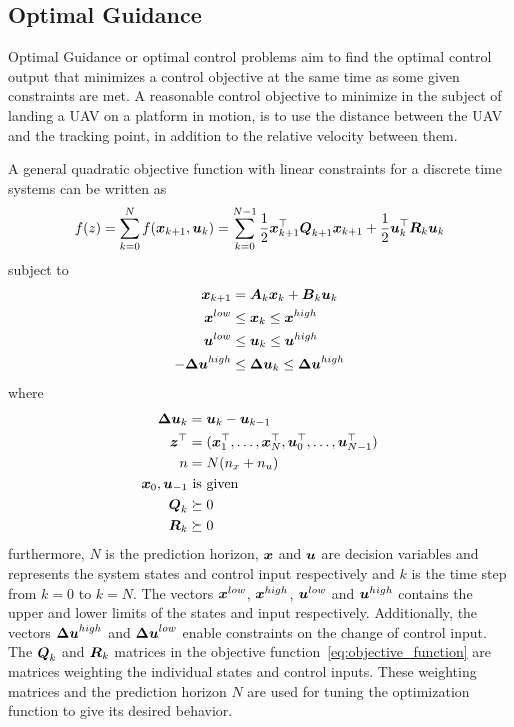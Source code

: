 \subsection{Optimal Guidance} %
\label{sub:optimal_guidance}
Optimal Guidance or optimal control problems aim to find the optimal control output that minimizes a control objective at the same time as some given constraints are met. A reasonable control objective to minimize in the subject of landing a \gls{UAV} on a platform in motion, is to use the distance between the \gls{UAV} and the tracking point, in addition to the relative velocity between them.  

A general quadratic objective function with linear constraints for a discrete time systems can be written as \citep{foss2013merging}
\begin{equation}\label{eq:objective_function}
	f(z)=\sum_{k=0}^{N}{f(\boldsymbol{x}_{k+1},\boldsymbol{u}_{k})}=\sum_{k=0}^{N-1}\frac{1}{2}\boldsymbol{x}_{k+1}^{\top}\boldsymbol{Q}_{k+1}\boldsymbol{x}_{k+1}+\frac{1}{2}\boldsymbol{u}_{k}^{\top}\boldsymbol{R}_{k}\boldsymbol{u}_{k}
\end{equation}
subject to
\begin{align}
	\boldsymbol{x}_{k+1}&=\boldsymbol{A}_k\boldsymbol{x}_k+\boldsymbol{B}_k\boldsymbol{u}_k\label{eq:objective_equality_const}\\
	\boldsymbol{x}^{low}&\le\boldsymbol{x}_k\le\boldsymbol{x}^{high}\\
	\boldsymbol{u}^{low}&\le\boldsymbol{u}_k\le\boldsymbol{u}^{high}\\
	-\boldsymbol{\Delta u}^{high}&\le\boldsymbol{\Delta u}_k\le\boldsymbol{\Delta u}^{high}
\end{align}
where
\begin{align}
	\label{eq:object_constraints_first}
	\boldsymbol{\Delta u}_k&=\boldsymbol{u}_k-\boldsymbol{u}_{k-1}\\
	\boldsymbol{z}^{\top}&=(\boldsymbol{x}_1^{\top},\dots,\boldsymbol{x}_N^{\top},\boldsymbol{u}_0^{\top},\dots,\boldsymbol{u}_{N-1}^{\top}) \\
	n&=N(n_x+n_u) \\
	\boldsymbol{x}_0, \boldsymbol{u}_{-1}&\text{ is given}\\
	\boldsymbol{Q}_k&\succeq0\\
	\label{eq:object_constraints_last}
	\boldsymbol{R}_k&\succeq0
\end{align}
furthermore, $N$ is the prediction horizon, $\boldsymbol{x}$ and $\boldsymbol{u}$ are decision variables and represents the system states and control input respectively and $k$ is the time step from $k=0$ to $k=N$. The vectors $\boldsymbol{x}^{low}$, $\boldsymbol{x}^{high}$, $\boldsymbol{u}^{low}$ and $\boldsymbol{u}^{high}$ contains the upper and lower limits of the states and input respectively. Additionally, the vectors $\boldsymbol{\Delta u}^{high}$ and $\boldsymbol{\Delta u}^{low}$ enable constraints on the change of control input. The $\boldsymbol{Q}_k$ and $\boldsymbol{R}_k$ matrices in the objective function~\ref{eq:objective_function} are matrices weighting the individual states and control inputs. These weighting matrices and the prediction horizon $N$ are used for tuning the optimization function to give its desired behavior.

